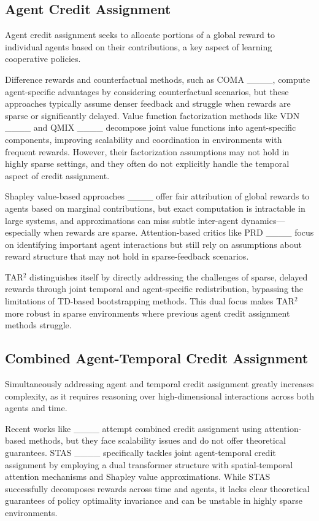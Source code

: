 \subsection{Agent Credit Assignment}
\label{subsec:agent-credit-assignment}

Agent credit assignment seeks to allocate portions of a global reward to individual agents based on their contributions, a key aspect of learning cooperative policies.

Difference rewards and counterfactual methods, such as COMA ____, compute agent-specific advantages by considering counterfactual scenarios, but these approaches typically assume denser feedback and struggle when rewards are sparse or significantly delayed. Value function factorization methods like VDN ____ and QMIX ____ decompose joint value functions into agent-specific components, improving scalability and coordination in environments with frequent rewards. However, their factorization assumptions may not hold in highly sparse settings, and they often do not explicitly handle the temporal aspect of credit assignment.

Shapley value-based approaches ____ offer fair attribution of global rewards to agents based on marginal contributions, but exact computation is intractable in large systems, and approximations can miss subtle inter-agent dynamics—especially when rewards are sparse. Attention-based critics like PRD ____ focus on identifying important agent interactions but still rely on assumptions about reward structure that may not hold in sparse-feedback scenarios.

TAR\(^{2}\) distinguishes itself by directly addressing the challenges of sparse, delayed rewards through joint temporal and agent-specific redistribution, bypassing the limitations of TD-based bootstrapping methods. This dual focus makes TAR\(^{2}\) more robust in sparse environments where previous agent credit assignment methods struggle.

\subsection{Combined Agent-Temporal Credit Assignment}
\label{subsec:agent-temporal-credit-assignment}

Simultaneously addressing agent and temporal credit assignment greatly increases complexity, as it requires reasoning over high-dimensional interactions across both agents and time.

Recent works like ____ attempt combined credit assignment using attention-based methods, but they face scalability issues and do not offer theoretical guarantees. STAS ____ specifically tackles joint agent-temporal credit assignment by employing a dual transformer structure with spatial-temporal attention mechanisms and Shapley value approximations. While STAS successfully decomposes rewards across time and agents, it lacks clear theoretical guarantees of policy optimality invariance and can be unstable in highly sparse environments.

